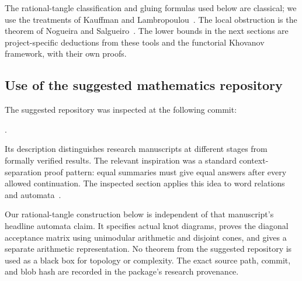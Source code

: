 The rational-tangle classification and gluing formulas used below are
classical; we use the treatments of Kauffman and
Lambropoulou~\cite{kauffman-lambropoulou-tangles,
kauffman-lambropoulou-knots,KauffmanLambropoulouHard}.
The local obstruction is the theorem of Nogueira and
Salgueiro~\cite{nogueira-salgueiro}. The lower bounds in the next sections
are project-specific deductions from these tools and the functorial
Khovanov framework, with their own proofs.

\subsection{Use of the suggested mathematics repository}

The suggested  repository was inspected at the following commit:
\begin{center}
.
\end{center}
Its description distinguishes
research manuscripts at different stages from formally verified results.
The relevant inspiration was a standard context-separation proof pattern:
equal summaries must give equal answers after every allowed continuation.
The inspected section applies this idea to word relations and
automata~\cite{OpenAIMathContextSeparation}.

Our rational-tangle construction below is independent of that manuscript's
headline automata claim. It specifies actual knot diagrams, proves the
diagonal acceptance matrix using unimodular arithmetic and disjoint cones,
and gives a separate arithmetic representation. No theorem from the
suggested repository is used as a black box for topology or complexity.
The exact source path, commit, and blob hash are recorded in the package's
research provenance.
